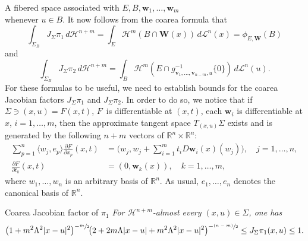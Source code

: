\documentclass[JEP,XML,SOM,Unicode,ThmDefs,NoEqCountersInSection]{cedram}
\newcommand{\psfrac}[2]{\sfrac{(#1)}{#2}}
\newenvironment{Empty}[2][\null]{%
\begin{enonce}[remark]{#1}#2}
{\end{enonce}}
\newcommand{\R}{\mathbb{R}}
\newcommand{\Rn}{\R^n}
\newcommand{\calH}{\mathscr{H}}
\newcommand{\calL}{\mathscr{L}}
\newcommand{\bW}{{\boldsymbol{W}}}
\newcommand{\bv}{{\boldsymbol{v}}}
\newcommand{\bw}{{\boldsymbol{w}}}
\let\la\langle
\let\ra\rangle
\begin{document}
\begin{Empty}[A fibered space associated with $E,B,\bw_1,\ldots,\bw_m$]
\begin{equation}
\end{equation}
whenever $u \in B$.
It now follows from the coarea formula that
\begin{equation}
\label{eq.9}
\int_{\Sigma_B} J_\Sigma \pi_1 \,d\calH^{n+m} = \int_E \calH^m(B \cap \bW(x)) \,d\calL^n(x) = \phi_{E,\bW}(B)
\end{equation}
and
\begin{equation}
\label{eq.10}
\int_{\Sigma_B} J_\Sigma \pi_2 \,d\calH^{n+m} = \int_B \calH^m(E \cap g_{\bv_1,\ldots,\bv_{n-m},u}^{-1}\{0\}) \,d\calL^n(u).
\end{equation}
For these formulas to be useful, we need to establish bounds for the coarea Jacobian factors $J_\Sigma \pi_1$ and $J_\Sigma \pi_2$.
In order to do so, we notice that if $\Sigma \ni (x,u) = F(x,t)$, $F$~is differentiable at $(x,t)$, \ie each $\bw_i$ is differentiable at $x$, $i=1,\ldots,m$, then the approximate tangent space $T_{(x,u)}\Sigma$ exists and is generated by the following $n+m$ vectors of $\Rn \times \Rn$:
\begin{equation*}
\begin{split}
\sum_{p=1}^n \la w_j, e_p \ra \frac{\partial F}{\partial x_p}(x,t) & = \biggl(w_j, w_j +\sum_{i=1}^m t_i D \bw_i(x)(w_j) \biggr), \quad j=1,\ldots,n, \\
\frac{\partial F}{\partial t_k}(x,t) & =(0, \bw_k(x)), \quad k=1,\ldots,m,
\end{split}
\end{equation*}
where $w_1,\ldots,w_n$ is an arbitrary basis of $\Rn$.
As usual, $e_1,\ldots,e_n$ denotes the canonical basis of $\Rn$.
\end{Empty}

\begin{Empty}[Coarea Jacobian factor of $\pi_1$]
\label{factor.pi.1}
{\it
For $\calH^{n+m}$-almost every $(x,u) \in \Sigma$, one has
\begin{equation*}
\bigl(1 + m^2 \Lambda^2 |x-u|^2\bigr)^{-\sfrac{m}{2}}\!\bigl(2 + 2m\Lambda |x-u| + m^2\Lambda^2 |x-u|^2 \bigr)^{-\psfrac{n-m}{2}}
\leq J_\Sigma \pi_1(x,u) \leq 1.
\end{equation*}
}
\end{Empty}
\end{document}

